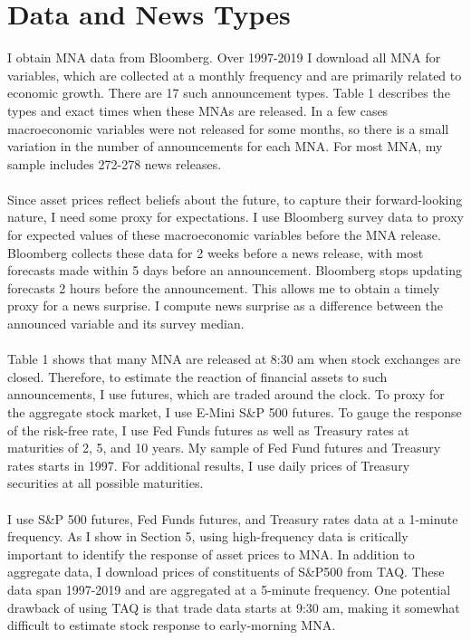 \documentclass[12pt]{article}
\begin{document}
\section{Data and News Types} \label{sec:Model}

I obtain MNA data from Bloomberg. Over 1997-2019 I download all MNA for variables, which are collected at a monthly frequency and are primarily related to economic growth. There are 17 such announcement types. Table 1 describes the types and exact times when these MNAs are released. In a few cases macroeconomic variables were not released for some months, so there is a small variation in the number of announcements for each MNA. For most MNA, my sample includes 272-278 news releases.
\paragraph{}
Since asset prices reflect beliefs about the future, to capture their forward-looking nature, I need some proxy for expectations. I use Bloomberg survey data to proxy for expected values of these macroeconomic variables before the MNA release. Bloomberg collects these data for 2 weeks before a news release, with most forecasts made within 5 days before an announcement. Bloomberg stops updating forecasts 2 hours before the announcement. This allows me to obtain a timely proxy for a news surprise. I compute news surprise as a difference between the announced variable and its survey median.
\paragraph{}
Table 1 shows that many MNA are released at 8:30 am when stock exchanges are closed. Therefore, to estimate the reaction of financial assets to such announcements, I use futures, which are traded around the clock. To proxy for the aggregate stock market, I use E-Mini S\&P 500 futures. To gauge the response of the risk-free rate, I use Fed Funds futures as well as Treasury rates at maturities of 2, 5, and 10 years. My sample of Fed Fund futures and Treasury rates starts in 1997. For additional results, I use daily prices of Treasury securities at all possible maturities.
\paragraph{}
I use S\&P 500 futures, Fed Funds futures, and Treasury rates data at a 1-minute frequency. As I show in Section 5, using high-frequency data is critically important to identify the response of asset prices to MNA. In addition to aggregate data, I download prices of constituents of S\&P500 from TAQ. These data span 1997-2019 and are aggregated at a 5-minute frequency. One potential drawback of using TAQ is that trade data starts at 9:30 am, making it somewhat difficult to estimate stock response to early-morning MNA.
\end{document}
